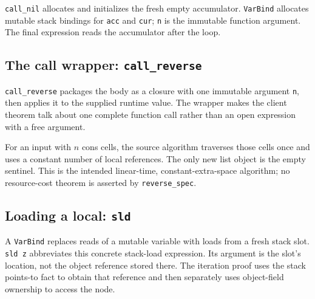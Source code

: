 \documentclass[11pt]{article}
\begin{document}
\begin{minipage}{\linewidth}

\end{minipage}

\texttt{call\_nil} allocates and initializes the fresh empty accumulator.
\texttt{VarBind} allocates mutable stack bindings for \texttt{acc} and
\texttt{cur}; \texttt{n} is the immutable function argument. The final expression
reads the accumulator after the loop.

\subsection{The call wrapper: \texttt{call\_reverse}}

\begin{minipage}{\linewidth}

\end{minipage}

\texttt{call\_reverse} packages the body as a closure with one immutable
argument \texttt{n}, then applies it to the supplied runtime value. The
wrapper makes the client theorem talk about one complete function call rather
than an open expression with a free argument.

For an input with \(n\) cons cells, the source algorithm traverses those cells
once and uses a constant number of local references. The only new list object
is the empty sentinel. This is the intended linear-time, constant-extra-space
algorithm; no resource-cost theorem is asserted by \texttt{reverse\_spec}.

\subsection{Loading a local: \texttt{sld}}

\begin{minipage}{\linewidth}

\end{minipage}

A \texttt{VarBind} replaces reads of a mutable variable with loads from a fresh
stack slot. \texttt{sld z} abbreviates this concrete stack-load expression.
Its argument is the slot's location, not the object reference stored there.
The iteration proof uses the stack points-to fact to obtain that reference
and then separately uses object-field ownership to access the node.
\end{document}
